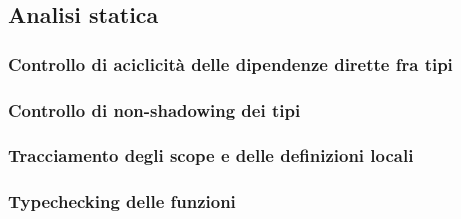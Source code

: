 \subsection{Analisi statica}

\subsubsection{Controllo di aciclicità delle dipendenze dirette fra tipi}
\subsubsection{Controllo di non-shadowing dei tipi}
\subsubsection{Tracciamento degli scope e delle definizioni locali}
\subsubsection{Typechecking delle funzioni}